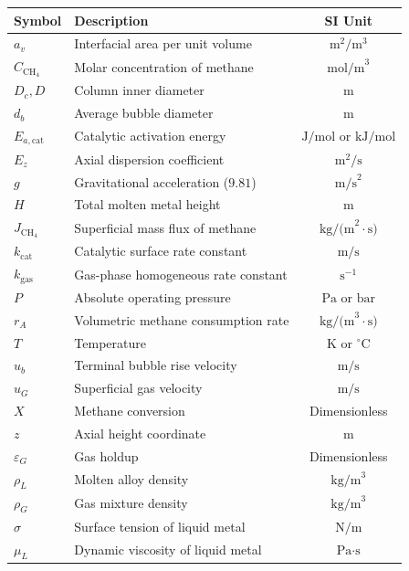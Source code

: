 \documentclass[12pt,a4paper,oneside]{report}
\begin{document}
\begin{longtable}{llc}
\toprule
\textbf{Symbol} & \textbf{Description} & \textbf{SI Unit} \\
\midrule
$a_v$ & Interfacial area per unit volume & $\text{m}^2/\text{m}^3$ \\
$C_{\text{CH}_4}$ & Molar concentration of methane & $\text{mol/m}^3$ \\
$D_c, D$ & Column inner diameter & $\text{m}$ \\
$d_b$ & Average bubble diameter & $\text{m}$ \\
$E_{a,\text{cat}}$ & Catalytic activation energy & $\text{J/mol}$ or $\text{kJ/mol}$ \\
$E_z$ & Axial dispersion coefficient & $\text{m}^2/\text{s}$ \\
$g$ & Gravitational acceleration ($9.81$) & $\text{m/s}^2$ \\
$H$ & Total molten metal height & $\text{m}$ \\
$J_{\text{CH}_4}$ & Superficial mass flux of methane & $\text{kg/(m}^2\cdot\text{s)}$ \\
$k_{\text{cat}}$ & Catalytic surface rate constant & $\text{m/s}$ \\
$k_{\text{gas}}$ & Gas-phase homogeneous rate constant & $\text{s}^{-1}$ \\
$P$ & Absolute operating pressure & $\text{Pa}$ or $\text{bar}$ \\
$r_A$ & Volumetric methane consumption rate & $\text{kg/(m}^3\cdot\text{s)}$ \\
$T$ & Temperature & $\text{K}$ or $\text{}^\circ\text{C}$ \\
$u_b$ & Terminal bubble rise velocity & $\text{m/s}$ \\
$u_G$ & Superficial gas velocity & $\text{m/s}$ \\
$X$ & Methane conversion & Dimensionless \\
$z$ & Axial height coordinate & $\text{m}$ \\
$\varepsilon_G$ & Gas holdup & Dimensionless \\
$\rho_L$ & Molten alloy density & $\text{kg/m}^3$ \\
$\rho_G$ & Gas mixture density & $\text{kg/m}^3$ \\
$\sigma$ & Surface tension of liquid metal & $\text{N/m}$ \\
$\mu_L$ & Dynamic viscosity of liquid metal & $\text{Pa}\cdot\text{s}$ \\
\bottomrule
\end{longtable}
\end{document}
